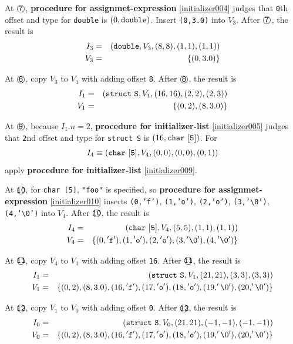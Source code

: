\begin{Example}
\noindent
At $\MARU{{\tt 7}}$, {\bf procedure for assignmet-expression}
 \ref{initializer004} judges that
{\tt{0}}th offset and type for {\tt{double}} is $(0,{\tt{double}})$.
Insert {\tt (0,3.0)} into $V_3$.
After $\MARU{{\tt 7}}$, the result is
\begin{eqnarray*}
I_3 & = & ({\tt{double}},V_3,(8,8),(1,1),(1,1)) \\
V_3 & = & \{(0,3.0)\}
\end{eqnarray*}

\noindent
At $\MARU{\tt 8}$,
copy $V_3$ to $V_1$ with adding offset {\tt{8}}.
After $\MARU{{\tt 8}}$, the result is
\begin{eqnarray*}
I_1 & = & ({\tt{struct\,\,S}},V_1,(16,16),(2,2),(2,3)) \\
V_1 & = & \{(0,2),(8,3.0)\}
\end{eqnarray*}

\noindent
At $\MARU{{\tt 9}}$, because $I_1.n = 2$,
{\bf procedure for initializer-list}
\ref{initializer005} judges that
{\tt{2}}nd offset and type for {\tt{struct S}} is $(16,{\tt{char\,\,[5]}})$.
For
\[
I_4 \equiv ({\tt{char\,\,[5]}},V_4,(0,0),(0,0),(0,1)) 
\]
apply {\bf procedure for initializer-list}
\ref{initializer009}.

\noindent
At $\MARU{{\tt 10}}$, for {\tt char [5]},
{\tt "foo"} is specified, so
{\bf procedure for assignmet-expression}
\ref{initializer010} inserts {\tt{(0,'f')}},
{\tt{(1,'o')}},
{\tt{(2,'o')}},
{\tt{(3,'\verb|\|0')}},
{\tt{(4,'\verb|\|0')}} into $V_4$.
After $\MARU{{\tt 10}}$, the result is
\begin{eqnarray*}
I_4 & = & ({\tt{char\,\,[5]}}, V_4, (5,5),(1,1),(1,1)) \\
V_4 & = & \{(0,{\tt{'f'}}),(1,{\tt{'o'}}),(2,{\tt{'o'}}),
(3,{\tt{'\verb|\|0'}}),(4,{\tt{'\verb|\|0'}})\}
\end{eqnarray*}

\noindent
At $\MARU{\tt 11}$,
copy $V_4$ to $V_1$ with adding offset {\tt 16}.
After $\MARU{{\tt 11}}$, the result is
\begin{eqnarray*}
I_1 & = & ({\tt{struct\,\,S}},V_1,(21,21),(3,3),(3,3)) \\
V_1 & = & \{(0,2),(8,3.0),
(16,{\tt{'f'}}),(17,{\tt{'o'}}),(18,{\tt{'o'}}),
(19,'\verb|\|0'),(20,'\verb|\|0')
\}
\end{eqnarray*}

\noindent
At $\MARU{\tt 12}$, copy $V_1$ to $V_0$ with adding offset {\tt 0}.
After $\MARU{{\tt 12}}$, the result is
\begin{eqnarray*}
I_0 & = & ({\tt{struct\,\,S}},V_0,(21,21),(-1,-1),(-1,-1)) \\
V_0 & = & \{(0,2),(8,3.0),
(16,{\tt{'f'}}),(17,{\tt{'o'}}),(18,{\tt{'o'}}),
(19,'\verb|\|0'),(20,'\verb|\|0')
\}
\end{eqnarray*}

\end{Example}

